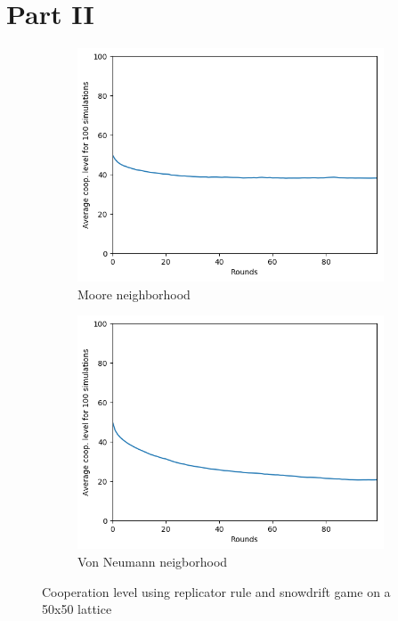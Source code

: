 \documentclass[letterpaper]{article}
\begin{document}
\section{Part II}

\begin{figure}
    \begin{subfigure}{.5\textwidth}
        \centering
        \includegraphics[width=1\linewidth]{images/assign2/50-part2}
        \caption{Moore neighborhood}
        \label{fig:50moorepart2}
    \end{subfigure}
    \begin{subfigure}{.5\textwidth}
        \centering
        \includegraphics[width=1\linewidth]{images/assign2/50_vonneumann-part2}
        \caption{Von Neumann neigborhood}
        \label{fig:50vonpart2}
    \end{subfigure}
    \caption{Cooperation level using replicator rule and
    snowdrift game on a 50x50 lattice}
    \label{fig:50part2}
\end{figure}
\end{document}
